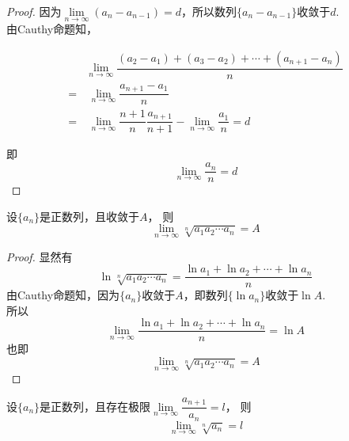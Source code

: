 \begin{proof}

    因为$\lim\limits_{n \to \infty}{(a_n - a_{n - 1})} = d$，所以数列$\{a_n - a_{n - 1}\}$收敛于$d$. \\
    由\textup{Cauthy}命题知，
    
    \begin{align*}
        & \lim\limits_{n \to \infty}{\dfrac{(a_2 - a_1) + (a_3 - a_2) + \cdots + (a_{n + 1} - a_n)}{n}} \\
        = & \ \lim\limits_{n \to \infty}{\dfrac{a_{n + 1} - a_1}{n}} \\
        = & \ \lim\limits_{n \to \infty}{\dfrac{n + 1}{n} \dfrac{a_{n + 1}}{n + 1}} - \lim\limits_{n \to \infty}{\dfrac{a_1}{n}} = d
    \end{align*}

    即
    $$\lim\limits_{n \to \infty}{\dfrac{a_n}{n}} = d$$

\end{proof}

\begin{corollary}[Cauthy命题推论]

    设$\{a_n\}$是正数列，且收敛于$A$，
    则
    $$\lim\limits_{n \to \infty}{\sqrt[n]{a_1a_2\cdots a_n}} = A$$

\end{corollary}

\begin{proof}

    显然有
    $$\ln{\sqrt[n]{a_1 a_2 \cdots a_n}} = \dfrac{\ln{a_1} + \ln{a_2} + \cdots + \ln{a_n}}{n}$$
    由\textup{Cauthy}命题知，因为$\{a_n\}$收敛于$A$，即数列$\{\ln{a_n}\}$收敛于$\ln{A}$. \\    
    所以
    $$\lim\limits_{n \to \infty}{\dfrac{\ln{a_1} + \ln{a_2} + \cdots + \ln{a_n}}{n}} = \ln{A}$$
    也即
    $$\lim\limits_{n \to \infty}{\sqrt[n]{a_1 a_2 \cdots a_n}} = A$$

\end{proof}


\begin{corollary}[Cauthy命题推论]

    设$\{a_n\}$是正数列，且存在极限$\lim\limits_{n \to \infty}{\dfrac{a_{n + 1}}{a_n}} = l$，
    则
    $$\lim\limits_{n \to \infty}{\sqrt[n]{a_n}} = l$$

\end{corollary}

